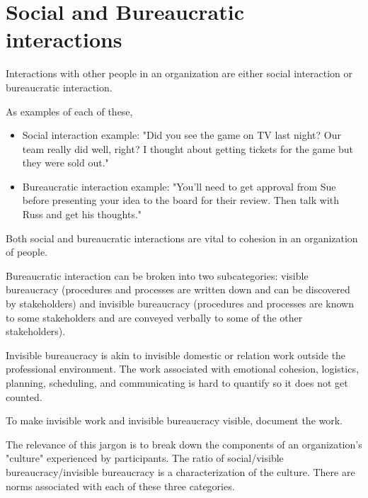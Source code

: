 
\section{Social and Bureaucratic interactions}

Interactions with other people in an organization are either social interaction or bureaucratic interaction. 

As examples of each of these,
\begin{itemize}
\item Social interaction example: "Did you see the game on TV last night? Our team really did well, right? I thought about getting tickets for the game but they were sold out."
\item Bureaucratic interaction example: "You'll need to get approval from Sue before presenting your idea to the board for their review. Then talk with Russ and get his thoughts."
\end{itemize}
Both social and bureaucratic interactions are vital to cohesion in an organization of people. 


Bureaucratic interaction can be broken into two subcategories: \gls{visible bureaucracy} (procedures and processes are written down and can be discovered by stakeholders)  and \gls{invisible bureaucracy} (procedures and processes are known to some stakeholders and are conveyed verbally to some of the other stakeholders).

Invisible bureaucracy is akin to invisible domestic or relation work outside the professional environment. The work associated with emotional cohesion, logistics, planning, scheduling, and communicating is hard to quantify so it does not get counted.

To make invisible work and invisible bureaucracy visible, document the work.


The relevance of this jargon is to break down the components of an organization's "culture" experienced by participants. The ratio of social/visible bureaucracy/invisible bureaucracy is a characterization of the culture. There are norms associated with each of these three categories.